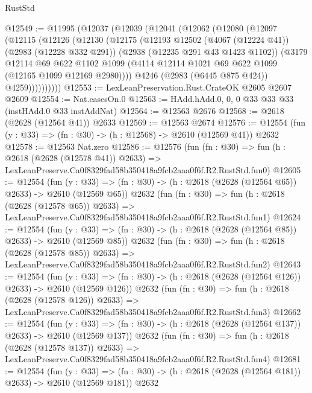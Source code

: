 \begin{lexlean}{RustStd}
\begin{coremodule}
@12549 := @11995
    (@12037
      (@12039
        (@12041
          (@12062
            (@12080
              (@12097
                (@12115
                  (@12126
                    (@12130
                      (@12175
                        (@12193
                          @12502
                          (@4067 (@12224 @41))
                          (@2983 (@12228 @332 @291))
                          (@2938 (@12235 @291 @43 @1423 @1102))
                          (@3179
                            @12114
                            @69
                            @622
                            @1102
                            @1099
                            (@4114 @12114 @1021 @69 @622 @1099 (@12165 @1099 @12169 @2980))))
                        @4246
                        (@2983 (@6445 @875 @424))
                        @4259))))))))))
@12553 := LexLeanPreservation.Rust.CrateOK @2605 @2607 @2609
@12554 := Nat.casesOn.{0}
@12563 := HAdd.hAdd.{0, 0, 0} @33 @33 @33 (instHAdd.{0} @33 instAddNat)
@12564 := @12563 @2676
@12568 := @2618 (@2628 (@12564 @41)) @2633
@12569 := @12563 @2674
@12576 := @12554 (fun (y : @33) => (fn : @30) -> (h : @12568) -> @2610 (@12569 @41)) @2632
@12578 := @12563 Nat.zero
@12586 := @12576
    (fun (fn : @30) =>
    fun (h : @2618 (@2628 (@12578 @41)) @2633) =>
    LexLeanPreserve.Ca0f8329fad58b350418a9fcb2aaa0f6f.R2.RustStd.fun0)
@12605 := @12554
    (fun (y : @33) => (fn : @30) -> (h : @2618 (@2628 (@12564 @65)) @2633) -> @2610 (@12569 @65))
    @2632
    (fun (fn : @30) =>
    fun (h : @2618 (@2628 (@12578 @65)) @2633) =>
    LexLeanPreserve.Ca0f8329fad58b350418a9fcb2aaa0f6f.R2.RustStd.fun1)
@12624 := @12554
    (fun (y : @33) => (fn : @30) -> (h : @2618 (@2628 (@12564 @85)) @2633) -> @2610 (@12569 @85))
    @2632
    (fun (fn : @30) =>
    fun (h : @2618 (@2628 (@12578 @85)) @2633) =>
    LexLeanPreserve.Ca0f8329fad58b350418a9fcb2aaa0f6f.R2.RustStd.fun2)
@12643 := @12554
    (fun (y : @33) => (fn : @30) -> (h : @2618 (@2628 (@12564 @126)) @2633) -> @2610 (@12569 @126))
    @2632
    (fun (fn : @30) =>
    fun (h : @2618 (@2628 (@12578 @126)) @2633) =>
    LexLeanPreserve.Ca0f8329fad58b350418a9fcb2aaa0f6f.R2.RustStd.fun3)
@12662 := @12554
    (fun (y : @33) => (fn : @30) -> (h : @2618 (@2628 (@12564 @137)) @2633) -> @2610 (@12569 @137))
    @2632
    (fun (fn : @30) =>
    fun (h : @2618 (@2628 (@12578 @137)) @2633) =>
    LexLeanPreserve.Ca0f8329fad58b350418a9fcb2aaa0f6f.R2.RustStd.fun4)
@12681 := @12554
    (fun (y : @33) => (fn : @30) -> (h : @2618 (@2628 (@12564 @181)) @2633) -> @2610 (@12569 @181))
    @2632

\end{coremodule}
\end{lexlean}

